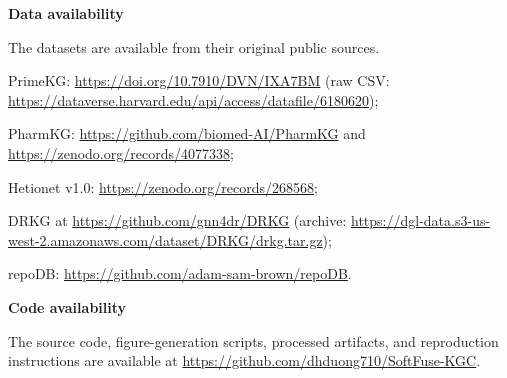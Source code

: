 \documentclass[pdflatex,sn-mathphys-num]{sn-jnl}
\begin{document}
\noindent\textbf{Data availability}\par
\noindent The datasets are available from their original public sources. 

PrimeKG: \url{https://doi.org/10.7910/DVN/IXA7BM} (raw CSV: \url{https://dataverse.harvard.edu/api/access/datafile/6180620}); 

PharmKG: \url{https://github.com/biomed-AI/PharmKG} and \url{https://zenodo.org/records/4077338}; 

Hetionet v1.0: \url{https://zenodo.org/records/268568}; 

DRKG at \url{https://github.com/gnn4dr/DRKG} (archive: \url{https://dgl-data.s3-us-west-2.amazonaws.com/dataset/DRKG/drkg.tar.gz});

repoDB: \url{https://github.com/adam-sam-brown/repoDB}.\par\smallskip

\noindent\textbf{Code availability}\par
\noindent The source code, figure-generation scripts, processed artifacts, and reproduction instructions are available at \url{https://github.com/dhduong710/SoftFuse-KGC}.


\end{document}

